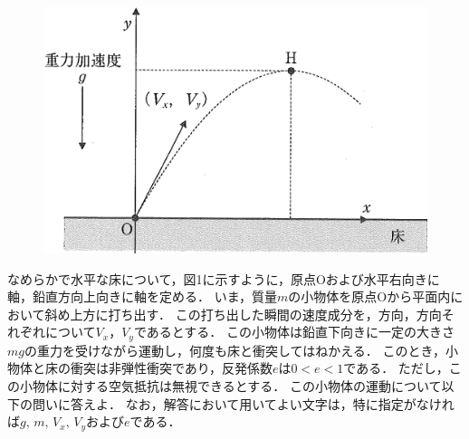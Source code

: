\setcounter{figure}{0}
{
\begin{figure}
  \vspace{-\intextsep}
  \includegraphics[width=22zw]{../graphs/noko_23_1.png}
  \caption{}
\end{figure}

なめらかで水平な床について，図1に示すように，原点Oおよび水平右向きに\x 軸，鉛直方向上向きに\y 軸を定める．
いま，質量$m$の小物体を原点Oから\xy 平面内において斜め上方に打ち出す．
この打ち出した瞬間の速度成分を，\x 方向，\y 方向それぞれについて$V_x$，$V_y$であるとする．
この小物体は鉛直下向きに一定の大きさ$mg$の重力を受けながら運動し，何度も床と衝突してはねかえる．
このとき，小物体と床の衝突は非弾性衝突であり，反発係数$e$は$0<e<1$である．
ただし，この小物体に対する空気抵抗は無視できるとする．
この小物体の運動について以下の問いに答えよ．
なお，解答において用いてよい文字は，特に指定がなければ$g,\,m,\,V_x,\,V_y$および$e$である．

\par}

